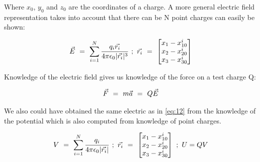 \documentclass{article}
\begin{document}
Where \begin{math} x_0 \end{math}, \begin{math} y_0 \end{math} and \begin{math} z_0 \end{math} are the coordinates of a charge. A more general electric field representation takes into account that there can be N point charges can easily be shown:

\begin{equation} \label{eq:12}
\vec{E} \hspace{0.125cm} = \hspace{0.125cm} \sum_{i=1}^{N} \frac{q_i\vec{r_i}}{4\pi \epsilon_0 |\vec{r_i}|^3} \hspace{0.125cm} ; \hspace{0.125cm} \vec{r_i}  \hspace{0.125cm} =  \hspace{0.125cm} \begin{bmatrix} x_1 -  x_{10}^{i} \\ x_2 - x_{20}^{i} \\ x_3 - x_{30}^{i} \end{bmatrix}
\end{equation}

Knowledge of the electric field gives us knowledge of the force on a test charge Q:

\begin{equation} \label{eq:13}
\vec{F} \hspace{0.125cm} = \hspace{0.125cm} m\vec{a} \hspace{0.125cm} = \hspace{0.125cm} Q\vec{E}
\end{equation}

We also could have obtained the same electric as in \ref{eq:12} from the knowledge of the potential which is also computed from knowledge of point charges. 

\begin{equation} \label{eq:14}
V \hspace{0.125cm} = \hspace{0.125cm} \sum_{i=1}^{N} \frac{q_i}{4\pi \epsilon_0 |\vec{r_i}|} \hspace{0.125cm} ; \hspace{0.125cm} \vec{r_i}  \hspace{0.125cm} =  \hspace{0.125cm} \begin{bmatrix} x_1 -  x_{10}^{i} \\ x_2 - x_{20}^{i} \\ x_3 - x_{30}^{i} \end{bmatrix} \hspace{0.125cm} ; \hspace{0.125cm} U = QV
\end{equation}
\end{document}
